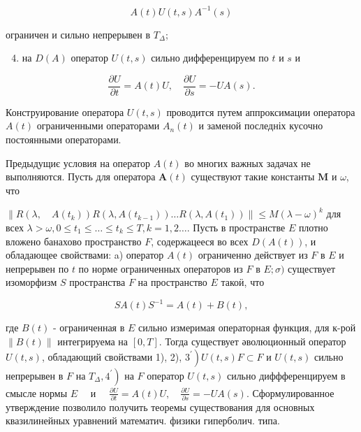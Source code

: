 \documentclass[10pt]{article}
\begin{document}
\[

A(t) U(t, s) A^{-1}(s)

\]



ограничен и сильно непрерывен в $T_{\Delta}$;



\begin{enumerate}

  \setcounter{enumi}{3}

  \item на $D(A)$ оператор $U(t, s)$ сильно дифференцируем по $t$ и $s$ и

\end{enumerate}



\[

\frac{\partial U}{\partial t}=A(t) U, \quad \frac{\partial U}{\partial s}=-U A(s) .

\]



Конструирование оператора $U(t, s)$ проводится путем аппроксимации оператора $A(t)$ ограниченными операторами $A_{n}(t)$ и заменой последніх кусочно постоянными операторами.



Предыдущиє условия на оператор $A(t)$ во многих важных задачах не выполняются. Пусть для оператора $\boldsymbol{A}(t)$ существуют такие константы $\boldsymbol{M}$ и $\omega$, что



$\left\|R\left(\lambda, \quad A\left(t_{k}\right)\right) R\left(\lambda, A\left(t_{k-1}\right)\right) \ldots R\left(\lambda, A\left(t_{1}\right)\right)\right\| \leqslant M(\lambda-\omega)^{k}$ для всех $\lambda>\omega, 0 \leqslant t_{1} \leqslant \ldots \leqslant t_{k} \leqslant T, k=1,2 \ldots$. Пусть в пространстве $E$ плотно вложено банахово пространство $F$, содержацееся во всех $D(A(t))$, и обладающее свойствами: a) оператор $A(t)$ ограниченно действует из $F$ в $E$ и непрерывен по $t$ по норме ограниченных операторов из $F$ в $E ; \sigma)$ существует изоморфизм $S$ пространства $F$ на пространство $E$ такоӥ, что



\[

S A(t) S^{-1}=A(t)+B(t),

\]



где $B(t)$ - ограниченная в $E$ сильно измеримая операторная функция, для к-рой $\|B(t)\|$ интегрируема на $[0, T]$. Тогда существует әволюционный оператор $U(t, s)$, обладающий свойствами 1), 2), $\left.3^{\prime}\right) U(t, s) F \subset F$ и $U(t, s)$ сильно непрерывен в $F$ на $\left.T_{\Delta}, 4^{\prime}\right)$ на $F$ оператор $U(t, s)$ сильно диффференцируем в смысле нормы $E \quad$ и $\quad \frac{\partial U}{\partial t}=A(t) U, \quad \frac{\partial U}{\partial s}=-U A(s)$. Сформулированное утверждение позволило получить теоремы существования для основных квазилинейных уравнений математич. физики гиперболич. типа.
\end{document}

